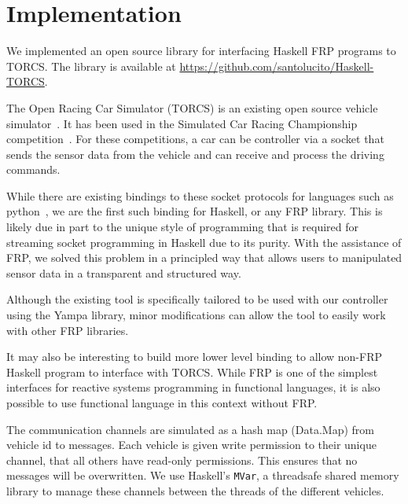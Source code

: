 \section{Implementation}

We implemented an open source library for interfacing Haskell FRP programs to TORCS.
The library is available at \url{https://github.com/santolucito/Haskell-TORCS}.

The Open Racing Car Simulator (TORCS) is an existing open source vehicle simulator~\cite{torcs}.
It has been used in the Simulated Car Racing Championship competition~\cite{SCRC}.
For these competitions, a car can be controller via a socket that sends the sensor data from the vehicle and can receive and process the driving commands.


While there are existing bindings to these socket protocols for languages such as python~\cite{snakeoil,pyscrc}, we are the first such binding for Haskell, or any FRP library.
This is likely due in part to the unique style of programming that is required for streaming socket programming in Haskell due to its purity.
With the assistance of FRP, we solved this problem in a principled way that allows users to manipulated sensor data in a transparent and structured way.


Although the existing tool is specifically tailored to be used with our controller using the Yampa library,
  minor modifications can allow the tool to easily work with other FRP libraries.

It may also be interesting to build more lower level binding to allow non-FRP Haskell program to interface with TORCS.
While FRP is one of the simplest interfaces for reactive systems programming in functional languages, it is also possible to use functional language in this context without FRP.


The communication channels are simulated as a hash map (Data.Map) from vehicle id to messages.
Each vehicle is given write permission to their unique channel, that all others have read-only permissions.
This ensures that no messages will be overwritten.
We use Haskell's \texttt{MVar}, a threadsafe shared memory library to manage these channels between the threads of the different vehicles.
